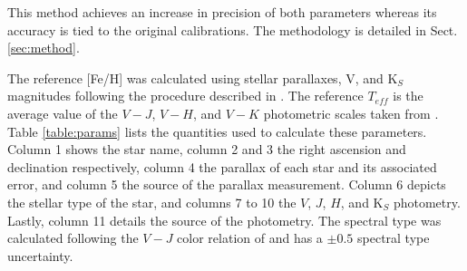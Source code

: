 \documentclass{aa}
\begin{document}
This method achieves an increase in precision of both parameters whereas its accuracy is tied to the original calibrations. The methodology is detailed in Sect. \ref{sec:method}. 

The reference [Fe/H] was calculated using stellar parallaxes, V, and K$_{S}$ magnitudes following the procedure described in \citet{Neves-2012}. The reference $T_{eff}$ is the average value of the $V-J$, $V-H$, and $V-K$ photometric scales taken from \citet{Casagrande-2008}. Table \ref{table:params} lists the quantities used to calculate these parameters. Column 1 shows the star name, column 2 and 3 the right ascension and declination respectively, column 4 the parallax of each star and its associated error, and column 5 the source of the parallax measurement. Column 6 depicts the stellar type of the star, and columns 7 to 10 the $V$, $J$, $H$, and K$_{S}$ photometry. Lastly, column 11 details the source of the photometry. The spectral type was calculated following the $V-J$ color relation of \citet{Lepine-2013} and has a $\pm 0.5$ spectral type uncertainty.

\end{document}
